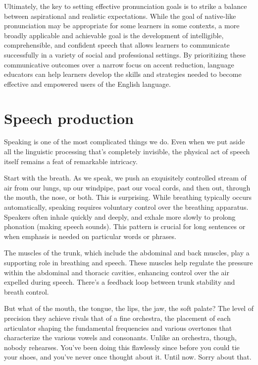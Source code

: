 Ultimately, the key to setting effective pronunciation goals is to strike a balance between aspirational and realistic expectations. While the goal of native-like pronunciation may be appropriate for some learners in some contexts, a more broadly applicable and achievable goal is the development of intelligible, comprehensible, and confident speech that allows learners to communicate successfully in a variety of social and professional settings. By prioritizing these communicative outcomes over a narrow focus on accent reduction, language educators can help learners develop the skills and strategies needed to become effective and empowered users of the English language.


\section{Speech production}
Speaking is one of the most complicated things we do. Even when we put aside all the linguistic processing that's completely invisible, the physical act of speech itself remains a feat of remarkable intricacy.

Start with the breath. As we speak, we push an exquisitely controlled stream of air from our lungs, up our windpipe, past our vocal cords, and then out, through the mouth, the nose, or both. This is surprising. While breathing typically occurs automatically, speaking requires voluntary control over the breathing apparatus. Speakers often inhale quickly and deeply, and exhale more slowly to prolong phonation (making speech sounds). This pattern is crucial for long sentences or when emphasis is needed on particular words or phrases.

The muscles of the trunk, which include the abdominal and back muscles, play a supporting role in breathing and speech. These muscles help regulate the pressure within the abdominal and thoracic cavities, enhancing control over the air expelled during speech. There's a feedback loop between trunk stability and breath control.

But what of the mouth, the tongue, the lips, the jaw, the soft palate? The level of precision they achieve rivals that of a fine orchestra, the placement of each articulator shaping the fundamental frequencies and various overtones that characterize the various vowels and consonants. Unlike an orchestra, though, nobody rehearses. You've been doing this flawlessly since before you could tie your shoes, and you've never once thought about it. Until now. Sorry about that.

